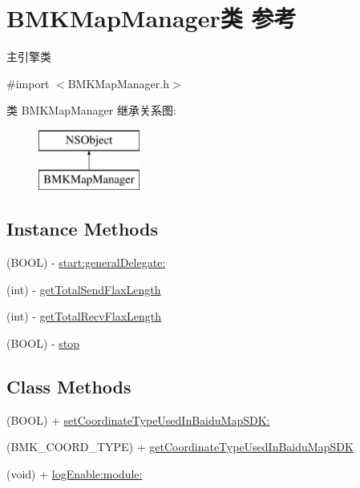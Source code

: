 \hypertarget{interface_b_m_k_map_manager}{}\section{B\+M\+K\+Map\+Manager类 参考}
\label{interface_b_m_k_map_manager}


主引擎类  




{\ttfamily \#import $<$B\+M\+K\+Map\+Manager.\+h$>$}

类 B\+M\+K\+Map\+Manager 继承关系图\+:\begin{figure}[H]
\begin{center}
\leavevmode
\includegraphics[height=2.000000cm]{interface_b_m_k_map_manager}
\end{center}
\end{figure}
\subsection*{Instance Methods}
\begin{DoxyCompactItemize}
\item 
(B\+O\+O\+L) -\/ \hyperlink{interface_b_m_k_map_manager_a95edf9c8fea4c61a79098641c4e9a50f}{start\+:general\+Delegate\+:}
\item 
(int) -\/ \hyperlink{interface_b_m_k_map_manager_a32730c8339c99d79243e13ba2acee3c3}{get\+Total\+Send\+Flax\+Length}
\item 
(int) -\/ \hyperlink{interface_b_m_k_map_manager_a57fcea9612cd09bf8b94bb9e06c7332e}{get\+Total\+Recv\+Flax\+Length}
\item 
(B\+O\+O\+L) -\/ \hyperlink{interface_b_m_k_map_manager_ac53850202f5017ff35c8933c171be0f1}{stop}
\end{DoxyCompactItemize}
\subsection*{Class Methods}
\begin{DoxyCompactItemize}
\item 
(B\+O\+O\+L) + \hyperlink{interface_b_m_k_map_manager_a3de693d719d6e1525e3afa561618afab}{set\+Coordinate\+Type\+Used\+In\+Baidu\+Map\+S\+D\+K\+:}
\item 
(B\+M\+K\+\_\+\+C\+O\+O\+R\+D\+\_\+\+T\+Y\+P\+E) + \hyperlink{interface_b_m_k_map_manager_aeff06053e7c7b7137a83ed06654e9afe}{get\+Coordinate\+Type\+Used\+In\+Baidu\+Map\+S\+D\+K}
\item 
(void) + \hyperlink{interface_b_m_k_map_manager_a3eedc38582f3f34c4a6f464a291472de}{log\+Enable\+:module\+:}
\end{DoxyCompactItemize}


